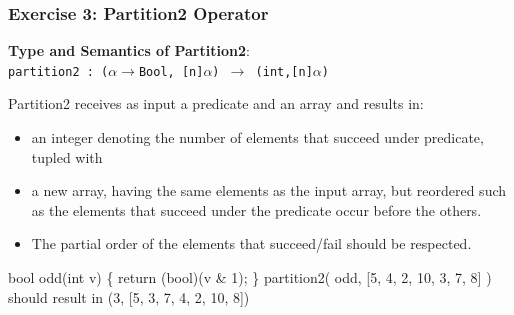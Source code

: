 \documentclass{beamer}
\renewcommand{\emph}[1]{\textcolor{CosGreen}{ #1}}
\begin{document}
\begin{frame}[fragile,t]
  \frametitle{Exercise 3: Partition2 Operator}

{\bf Type and Semantics of Partition2}:\\
\emph{\tt partition2 : ($\alpha\rightarrow$Bool, [n]$\alpha$) $\rightarrow$ (int,[n]$\alpha$)}\\\bigskip

Partition2 receives as input a predicate and an array and results in:
\begin{itemize}
    \item an integer denoting the number of elements that succeed under predicate, tupled with
    \item a new array, having the same elements as the input array, but reordered
            such as the elements that succeed under the predicate occur before the others.
    \item The partial order of the elements that succeed/fail should be respected.
\end{itemize}\bigskip

\begin{colorcode}
bool odd(int v) \{ return (bool)(v & 1); \}
partition2( odd, [5, 4, 2, 10, 3, 7, 8] ) should result in
             (3, [5, 3, 7, 4, 2, 10, 8])
\end{colorcode}

\end{frame}
\end{document}
